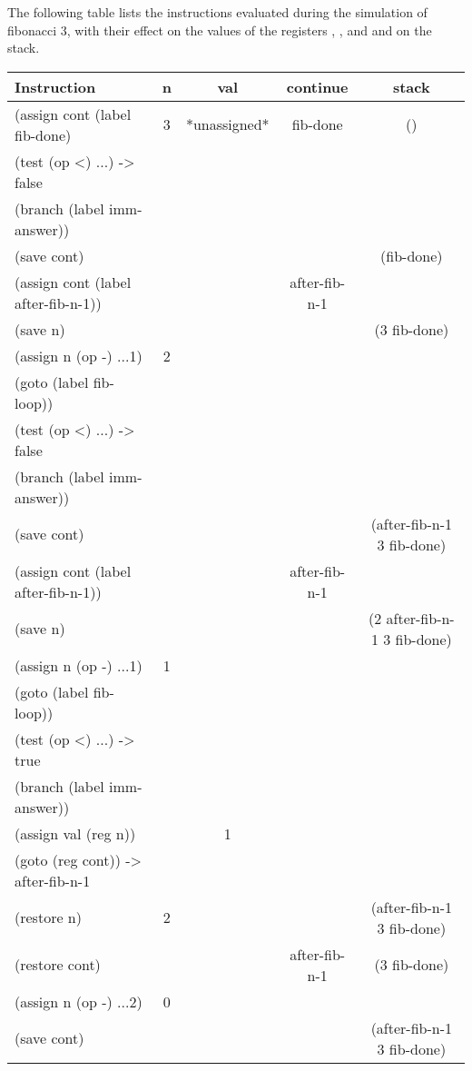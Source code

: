 \begin{exe}[5.5]
    The following table lists the instructions evaluated during the simulation 
    of fibonacci 3, with their effect on the values of the registers , 
    , and  and on the stack.
    \begin{longtable}{|l|c|c|c|c|}
        \hline
        \bfseries Instruction & \bfseries n & \bfseries val & \bfseries continue 
        & \bfseries stack \\\hline
        \endhead
        (assign cont (label fib-done) & 3 & *unassigned* & fib-done & () 
        \\\hline
        (test (op <) ...) -> false &&&& \\\hline
        (branch (label imm-answer)) &&&& \\\hline
        (save cont) &&&& (fib-done) \\\hline
        (assign cont (label after-fib-n-1)) &&& after-fib-n-1 & \\\hline
        (save n) &&&& (3 fib-done) \\\hline
        (assign n (op -) ...1) & 2 &&& \\\hline
        (goto (label fib-loop)) &&&& \\\hline
        (test (op <) ...) -> false &&&& \\\hline
        (branch (label imm-answer)) &&&& \\\hline
        (save cont) &&&& (after-fib-n-1 3 fib-done) \\\hline
        (assign cont (label after-fib-n-1)) &&& after-fib-n-1 & \\\hline
        (save n) &&&& (2 after-fib-n-1 3 fib-done) \\\hline
        (assign n (op -) ...1) & 1 &&& \\\hline
        (goto (label fib-loop)) &&&& \\\hline
        (test (op <) ...) -> true &&&& \\\hline
        (branch (label imm-answer)) &&&& \\\hline
        (assign val (reg n)) && 1 && \\\hline
        (goto (reg cont)) -> after-fib-n-1 &&&& \\\hline
        (restore n) & 2 &&& (after-fib-n-1 3 fib-done) \\\hline
        (restore cont) &&& after-fib-n-1 & (3 fib-done) \\\hline
        (assign n (op -) ...2) & 0 &&& \\\hline
        (save cont) &&&& (after-fib-n-1 3 fib-done) \\\hline

\end{longtable}
\end{exe}
